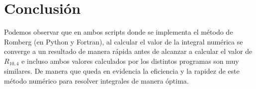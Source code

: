 \section{Conclusión}

Podemos observar que en ambos scripts donde se implementa el método de Romberg (en Python y Fortran), al calcular el valor de la integral numérica se converge a un resultado de manera rápida antes de alcanzar a calcular el valor de $R_{10,4}$ e incluso ambos valores calculados por los distintos programas son muy similares. De manera que queda en evidencia la eficiencia y la rapidez de este método numérico para resolver integrales de manera óptima. 